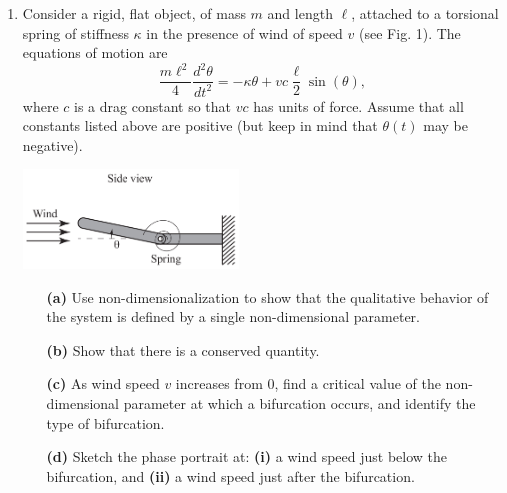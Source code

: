 \documentclass[10pt,letterpaper]{report}
\begin{document}
\begin{enumerate}
    \item 
    \begin{qbox}
    Consider a rigid, flat object, of mass $m$ and length $\ell$, attached to a torsional spring of stiffness $\kappa$ in the presence of wind of speed $v$ (see Fig. 1). The equations of motion are
    \[
    \frac{m\ell^2}{4}\frac{d^2\theta}{dt^2} = -\kappa\theta + vc\frac{\ell}{2}\sin(\theta),
    \]
    where $c$ is a drag constant so that $vc$ has units of force. Assume that all constants listed above are positive (but keep in mind that $\theta(t)$ may be negative).
    
    \begin{center}
        \includegraphics[width=0.45\textwidth]{img/2019S1.png}
    \end{center}
    
    \begin{itemize}
        \item[\textbf{(a)}] Use non-dimensionalization to show that the qualitative behavior of the system is defined by a single non-dimensional parameter.
        
        \item[\textbf{(b)}] Show that there is a conserved quantity.
        
        \item[\textbf{(c)}] As wind speed $v$ increases from 0, find a critical value of the non-dimensional parameter at which a bifurcation occurs, and identify the type of bifurcation.
        
        \item[\textbf{(d)}] Sketch the phase portrait at: \textbf{(i)} a wind speed just below the bifurcation, and \textbf{(ii)} a wind speed just after the bifurcation.
    \end{itemize}
    \end{qbox}
    

\end{enumerate}
\end{document}
